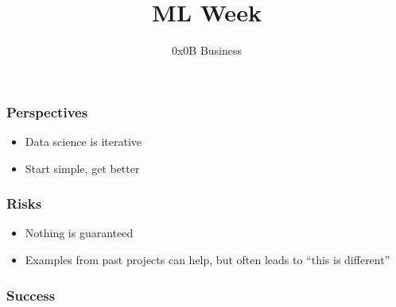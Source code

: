 
\title
{ML Week}
\subtitle{0x0B \hspace{2mm}  Business}




\begin{frame}
  \titlepage
\end{frame}

\begin{frame}[t]
  \frametitle{Perspectives}

  \vspace{1cm}
  \begin{itemize}
  \item Data science is iterative
  \item Start simple, get better
  \end{itemize}

\end{frame}

\begin{frame}[t]
  \frametitle{Risks}

  \vspace{1cm}
  \begin{itemize}
  \item Nothing is guaranteed
  \item Examples from past projects can help, but often leads to ``this is different''
  \end{itemize}
\end{frame}

\begin{frame}[t]
  \frametitle{Success}
  \vspace{2cm}
  \centerline{}
  \vspace{1cm}
\end{frame}

